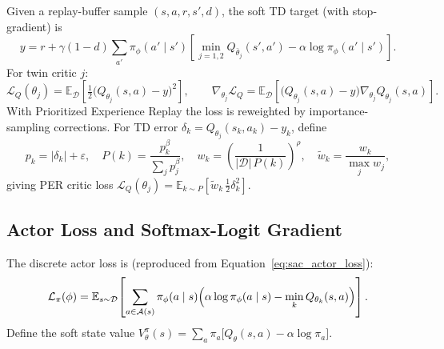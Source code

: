 Given a replay-buffer sample $(s,a,r,s',d)$, the soft TD target (with stop-gradient) is
\begin{equation}
  y = r + \gamma(1-d)\sum_{a'}\pi_\phi(a'\mid s')\!
      \left[\min_{j=1,2}Q_{\bar\theta_j}(s',a') - \alpha\log\pi_\phi(a'\mid s')\right].
\end{equation}
For twin critic $j$:
\begin{equation}
  \mathcal{L}_Q(\theta_j)
  = \mathbb{E}_{\mathcal{D}}\!\left[\tfrac{1}{2}\bigl(Q_{\theta_j}(s,a)-y\bigr)^2\right],
  \qquad
  \nabla_{\!\theta_j}\mathcal{L}_Q
  = \mathbb{E}_{\mathcal{D}}\!\left[\bigl(Q_{\theta_j}(s,a)-y\bigr)\nabla_{\!\theta_j}Q_{\theta_j}(s,a)\right].
\end{equation}
With Prioritized Experience Replay the loss is reweighted by importance-sampling corrections. For TD error $\delta_k = Q_{\theta_j}(s_k,a_k)-y_k$, define
\begin{equation}
  p_k = |\delta_k|+\varepsilon,\quad
  P(k) = \frac{p_k^\beta}{\sum_j p_j^\beta},\quad
  w_k = \!\left(\frac{1}{|\mathcal{D}|\,P(k)}\right)^{\!\rho},\quad
  \tilde w_k = \frac{w_k}{\max_j w_j},
  \label{eq:per_weights}
\end{equation}
giving PER critic loss $\mathcal{L}_Q(\theta_j) = \mathbb{E}_{k\sim P}[\tilde w_k\,\tfrac{1}{2}\delta_k^2]$.

\subsection{Actor Loss and Softmax-Logit Gradient}
\label{sec:Appendix_actor_gradient}

The discrete actor loss is (reproduced from Equation~\ref{eq:sac_actor_loss}):
\begin{equation}
  \mathcal{L}_\pi(\phi) = \mathbb{E}_{s\sim\mathcal{D}}\!\left[
    \sum_{a\in\mathcal{A}(s)}\pi_\phi(a\mid s)
    \Bigl(\alpha\log\pi_\phi(a\mid s) - \min_k Q_{\theta_k}(s,a)\Bigr)\right].
\end{equation}
Define the soft state value $V_\theta^\pi(s) = \sum_a\pi_a\bigl[Q_\theta(s,a)-\alpha\log\pi_a\bigr]$.

